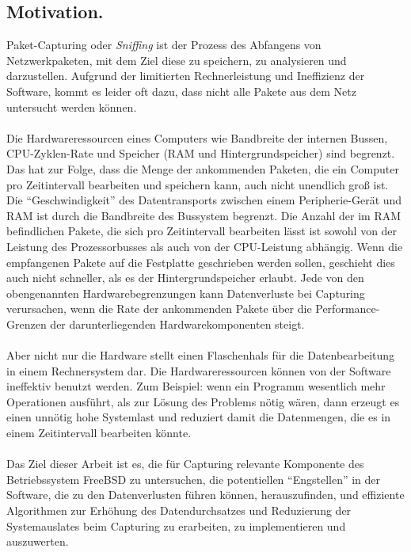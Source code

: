 \subsection{Motivation.}
Paket-Capturing oder \emph{Sniffing} ist der Prozess des Abfangens von
Netzwerkpaketen, mit dem Ziel diese zu speichern, zu analysieren und
darzustellen. Aufgrund der limitierten Rechnerleistung und Ineffizienz der
Software, kommt es leider oft dazu, dass nicht alle Pakete aus dem Netz
untersucht werden können.  \\\\
Die Hardwareressourcen eines Computers wie Bandbreite der internen Bussen,
CPU-Zyklen-Rate und Speicher (RAM und Hintergrundspeicher) sind begrenzt. Das
hat zur Folge, dass die Menge der ankommenden Paketen, die ein Computer pro
Zeitintervall bearbeiten und speichern kann, auch nicht unendlich groß ist.
Die ``Geschwindigkeit'' des Datentransports zwischen einem  Peripherie-Gerät
und RAM  ist durch die Bandbreite des Bussystem begrenzt. Die Anzahl der im RAM
befindlichen Pakete, die sich pro Zeitintervall bearbeiten lässt ist sowohl von
der Leistung  des Prozessorbusses als auch von der CPU-Leistung abhängig. Wenn
die empfangenen Pakete auf die Festplatte geschrieben werden sollen, geschieht
dies auch nicht schneller, als es der Hintergrundspeicher erlaubt. Jede von den
obengenannten Hardwarebegrenzungen kann Datenverluste bei Capturing
verursachen, wenn die Rate der ankommenden Pakete über die Performance-Grenzen
der darunterliegenden Hardwarekomponenten steigt.  \\\\
Aber nicht nur die Hardware stellt einen Flaschenhals für die Datenbearbeitung
in einem Rechnersystem dar. Die Hardwareressourcen können von der Software
ineffektiv benutzt werden. Zum Beispiel: wenn ein Programm wesentlich mehr
Operationen ausführt, als zur Lösung des Problems nötig wären, dann erzeugt es
einen unnötig hohe Systemlast und reduziert damit die Datenmengen, die es in
einem Zeitintervall bearbeiten könnte.  \\\\
%
Das Ziel dieser Arbeit ist es, die für Capturing relevante Komponente des
Betriebssystem FreeBSD zu untersuchen, die potentiellen ``Engstellen'' in der
Software, die zu den Datenverlusten führen können,  herauszufinden, und
effiziente Algorithmen zur Erhöhung des Datendurchsatzes und Reduzierung der
Systemauslates beim Capturing zu erarbeiten, zu implementieren und auszuwerten.
